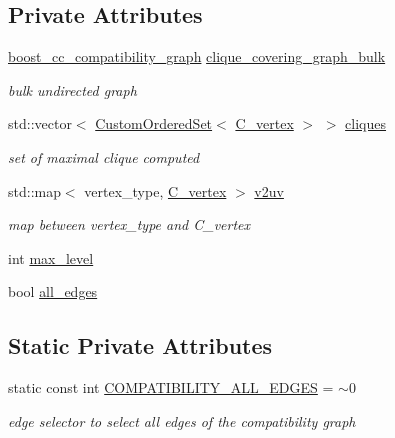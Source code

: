 \subsection*{Private Attributes}
\begin{DoxyCompactItemize}
\item 
\hyperlink{clique__covering__graph_8hpp_af47b1c28cf9a2c360afafb8d80582ce6}{boost\+\_\+cc\+\_\+compatibility\+\_\+graph} \hyperlink{classcoloring__based__clique__covering_a319e4f3b83fa1f43c94b27d40dbf49e0}{clique\+\_\+covering\+\_\+graph\+\_\+bulk}
\begin{DoxyCompactList}\small\item\em bulk undirected graph \end{DoxyCompactList}\item 
std\+::vector$<$ \hyperlink{classCustomOrderedSet}{Custom\+Ordered\+Set}$<$ \hyperlink{clique__covering__graph_8hpp_a9cb45047ea8c5ed95a8cfa90494345aa}{C\+\_\+vertex} $>$ $>$ \hyperlink{classcoloring__based__clique__covering_a95e53460db9f21e63f447099e2a54d38}{cliques}
\begin{DoxyCompactList}\small\item\em set of maximal clique computed \end{DoxyCompactList}\item 
std\+::map$<$ vertex\+\_\+type, \hyperlink{clique__covering__graph_8hpp_a9cb45047ea8c5ed95a8cfa90494345aa}{C\+\_\+vertex} $>$ \hyperlink{classcoloring__based__clique__covering_ab8dea13e2a517759b34e3684b105b67f}{v2uv}
\begin{DoxyCompactList}\small\item\em map between vertex\+\_\+type and C\+\_\+vertex \end{DoxyCompactList}\item 
int \hyperlink{classcoloring__based__clique__covering_a02e09454313d3388cd1c8509a5b0b3eb}{max\+\_\+level}
\item 
bool \hyperlink{classcoloring__based__clique__covering_aac58f7b536b43859651e4f29eb4b80ba}{all\+\_\+edges}
\end{DoxyCompactItemize}
\subsection*{Static Private Attributes}
\begin{DoxyCompactItemize}
\item 
static const int \hyperlink{classcoloring__based__clique__covering_aee1762a1d6fc72923106948b08c18dc6}{C\+O\+M\+P\+A\+T\+I\+B\+I\+L\+I\+T\+Y\+\_\+\+A\+L\+L\+\_\+\+E\+D\+G\+ES} = $\sim$0
\begin{DoxyCompactList}\small\item\em edge selector to select all edges of the compatibility graph \end{DoxyCompactList}\end{DoxyCompactItemize}
